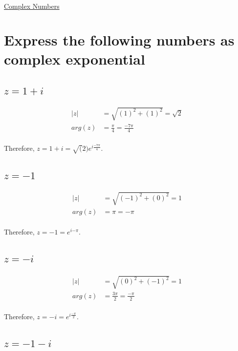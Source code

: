 \documentclass{article}
\renewcommand{\thesubsection}{\thesection.\alph{subsection}}
\begin{document}
\newpage

\begin{center}
	\Large{\underline{Complex Numbers}}
\end{center}

\section[Question ~\thesection]{Express the following numbers as complex exponential}

\subsection[~\thesubsection]{$z = 1 + i$}

\begin{align*}
	|z| &= \sqrt{(1)^2 + (1)^2} = \sqrt{2} \\
	arg(z) &= \frac{\pi}{4} = \frac{-7\pi}{4} \\
\end{align*}

Therefore, $z = 1 + i = \sqrt(2)e^{i{\frac{-7\pi}{4}}}$.

\subsection[~\thesubsection]{$z = -1$}

\begin{align*}
	|z| &= \sqrt{(-1)^2 + (0)^2} = 1 \\
	arg(z) &= \pi = -\pi \\
\end{align*}

Therefore, $z = -1 = e^{i{-\pi}}$.

\subsection[~\thesubsection]{$z = -i$}

\begin{align*}
	|z| &= \sqrt{(0)^2 + (-1)^2} = 1 \\
	arg(z) &= \frac{3\pi}{2} = \frac{-\pi}{2} \\
\end{align*}

Therefore, $z = -i = e^{i{\frac{-\pi}{2}}}$.

\subsection[~\thesubsection]{$z = - 1 - i$}
\end{document}
